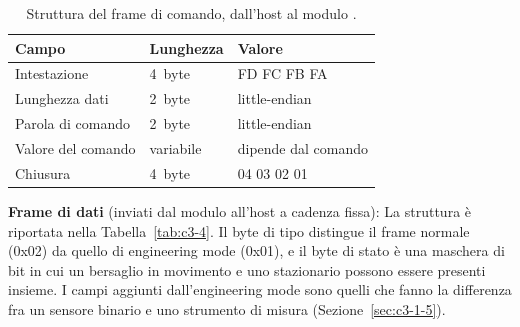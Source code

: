 \begin{table}[!htb]
\centering
\caption{Struttura del frame di comando, dall'host al modulo \cite{hilinkProtoV107}.}
\label{tab:c3-3}
\small
\begin{tabularx}{\linewidth}{@{}llX@{}}
\toprule
\textbf{Campo} & \textbf{Lunghezza} & \textbf{Valore} \\
\midrule
Intestazione & 4~byte & FD FC FB FA \\
Lunghezza dati & 2~byte & little-endian \\
Parola di comando & 2~byte & little-endian \\
Valore del comando & variabile & dipende dal comando \\
Chiusura & 4~byte & 04 03 02 01 \\
\bottomrule
\end{tabularx}
\end{table}

\textbf{Frame di dati} (inviati dal modulo all'host a cadenza fissa): La struttura è riportata nella Tabella~\ref{tab:c3-4}. Il byte di tipo distingue il frame normale (0x02) da quello di engineering mode (0x01), e il byte di stato è una maschera di bit in cui un bersaglio in movimento e uno stazionario possono essere presenti insieme. I campi aggiunti dall'engineering mode sono quelli che fanno la differenza fra un sensore binario e uno strumento di misura (Sezione~\ref{sec:c3-1-5}).

